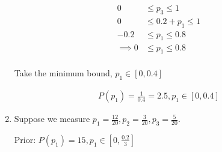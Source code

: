 \begin{enumerate}[label=\textbf{\Alph*}.]
    \begin{align*}
        0 &\le p_3 \le 1 \\
        0 &\le 0.2 + p_1 \le 1 \\
        -0.2 &\le p_1 \le 0.8 \\
        \implies 0 &\le p_1 \le 0.8 \\
    \end{align*}

    Take the minimum bound, $p_1 \in [0, 0.4]$

    \begin{align*}
        P(p_1) = \frac{1}{0.4} = 2.5, p_1 \in [0, 0.4]
    \end{align*}

    \item Suppose we measure $p_1 = \frac{12}{20}, p_2 = \frac{3}{20}, p_3 = \frac{5}{20}$.
    
    Prior: $P(p_1) = 15, p_1 \in [0, \frac{0.2}{3}]$

\end{enumerate}

